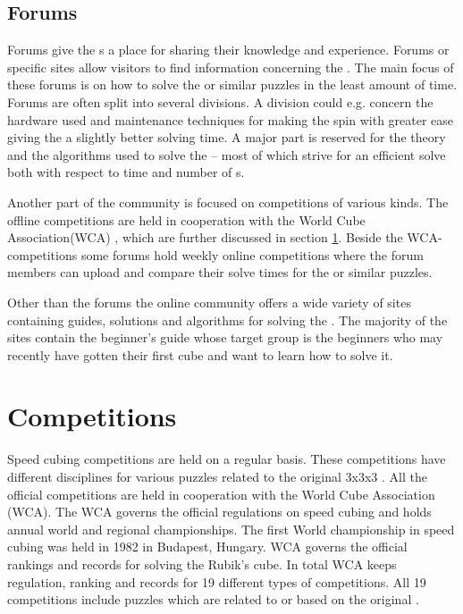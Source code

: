 \subsection{Forums}
Forums give the \cuber{}s a place for sharing their knowledge and experience\cite{speedsolving.com}\cite{speedcubing.dk}\cite{wca}. Forums or specific \rubik{} sites allow visitors to find information concerning the \rubik{}. The main focus of these forums is on how to solve the \rubik{} or similar puzzles in the least amount of time. Forums are often split into several divisions. A division could e.g. concern the hardware used and maintenance techniques for making the \rubik{} spin with greater ease giving the \cuber{} a slightly better solving time.
A major part is reserved for the theory and the algorithms used to solve the \rubik{} -- most of which strive for an efficient solve both with respect to time and number of \twist{}s.

Another part of the community is focused on competitions of various kinds. The offline competitions are held in cooperation with the World Cube Association(WCA) \cite{wca}, which are further discussed in section \ref{sec:wca}. Beside the WCA-competitions some forums hold weekly online competitions where the forum members can upload and compare their solve times for the \rubik{} or similar puzzles. 

Other than the forums the online community offers a wide variety of sites containing guides, solutions and algorithms for solving the \rubik{}. The majority of the \rubik{} sites contain the beginner's guide\cite{jasminLee08} whose target group is the beginners who may recently have gotten their first cube and want to learn how to solve it. 

\section{Competitions}
\label{sec:wca}
Speed cubing competitions are held on a regular basis\cite{wca/competitions}. These competitions have different disciplines for various puzzles related to the original 3x3x3 \rubik{}. All the official competitions are held in cooperation with the World Cube Association (WCA). The WCA governs the official regulations on speed cubing and holds annual world and regional championships. The first World championship in speed cubing was held in 1982 in Budapest, Hungary. WCA governs the official rankings and records for solving the Rubik's cube. In total WCA keeps regulation, ranking and records for 19 different types of competitions. All 19 competitions include puzzles which are related to or based on the original \rubik{}. 




